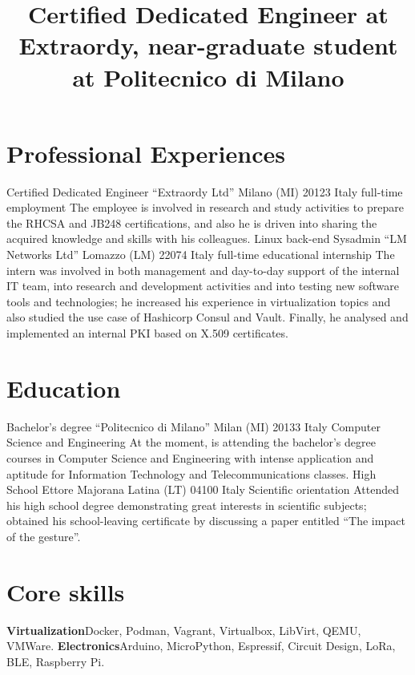 
\title{\normalsize%
    Certified Dedicated Engineer at Extraordy, near-graduate student at Politecnico di Milano
}
\maketitle

\section{Professional Experiences}
    {Certified Dedicated Engineer}
    {``Extraordy Ltd''}
    {Milano (MI) 20123 Italy}
    {full-time employment}
    {The employee is involved in research and study activities to prepare the RHCSA and JB248 certifications, and also he is driven into sharing the acquired knowledge and skills with his colleagues.}
    {Linux back-end Sysadmin}
    {``LM Networks Ltd''}
    {Lomazzo (LM) 22074 Italy}
    {full-time educational internship}
    {The intern was involved in both management and day-to-day support of the internal IT team, into research and development activities and into testing new software tools and technologies; he increased his experience in virtualization topics and also studied the use case of Hashicorp Consul and Vault. Finally, he analysed and implemented an internal PKI based on X.509 certificates.}

\section{Education}
    {Bachelor's degree}
    {``Politecnico di Milano''}
    {Milan (MI) 20133 Italy}
    {Computer Science and Engineering}
    {At the moment, is attending the bachelor's degree courses in Computer Science and Engineering with intense application and aptitude for Information Technology and Telecommunications classes.}
    {High School}
    {Ettore Majorana}
    {Latina (LT) 04100 Italy}
    {Scientific orientation}
    {Attended his high school degree demonstrating great interests in scientific subjects; obtained his school-leaving certificate by discussing a paper entitled ``The impact of the gesture''.}

\section{Core skills}
    {\textbf{Virtualization}}{Docker, Podman, Vagrant, Virtualbox, LibVirt, QEMU, VMWare.}
    {\textbf{Electronics}}{Arduino, MicroPython, Espressif, Circuit Design, LoRa, BLE, Raspberry Pi.}

